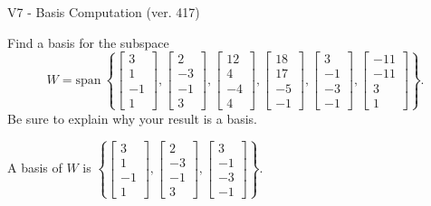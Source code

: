 \begin{exercise}
  \begin{exerciseTitle}V7 - Basis Computation (ver. 417)\end{exerciseTitle}
  \begin{exerciseStatement}
    Find a basis for the subspace 
\[W=\mathrm{span}\ \left\{\left[\begin{array}{r}
3 \\
1 \\
-1 \\
1
\end{array}\right] , \left[\begin{array}{r}
2 \\
-3 \\
-1 \\
3
\end{array}\right] , \left[\begin{array}{r}
12 \\
4 \\
-4 \\
4
\end{array}\right] , \left[\begin{array}{r}
18 \\
17 \\
-5 \\
-1
\end{array}\right] , \left[\begin{array}{r}
3 \\
-1 \\
-3 \\
-1
\end{array}\right] , \left[\begin{array}{r}
-11 \\
-11 \\
3 \\
1
\end{array}\right]\right\}.\]
 Be sure to explain why your result is a basis.


  \end{exerciseStatement}
  \begin{exerciseAnswer}
   A basis of \(W\) is  \(\left\{\left[\begin{array}{r}
3 \\
1 \\
-1 \\
1
\end{array}\right] , \left[\begin{array}{r}
2 \\
-3 \\
-1 \\
3
\end{array}\right] , \left[\begin{array}{r}
3 \\
-1 \\
-3 \\
-1
\end{array}\right]\right\}\).
  


  \end{exerciseAnswer}
\end{exercise}